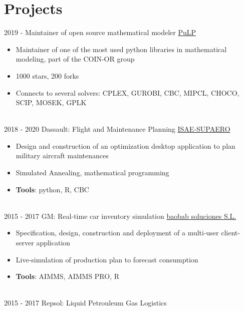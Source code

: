 \documentclass[letterpaper]{twentysecondcv} %
\begin{document}
\section{Projects}
\begin{twenty}
	\twentyitem
    	{2019 - }
		{}
        {Maintainer of open source mathematical modeler}
        {\href{https://github.com/coin-or/pulp}{PuLP}}
        {}
        {
        {\begin{itemize}
        \item Maintainer of one of the most used python libraries in mathematical modeling, part of the COIN-OR group
        \item 1000 stars, 200 forks
        \item Connects to several solvers: CPLEX, GUROBI, CBC, MIPCL, CHOCO, SCIP, MOSEK, GPLK
        \vspace{2mm}
		\end{itemize}}
        }
  \\
  \twentyitem
      {2018 - 2020}
    {}
        {Dassault: Flight and Maintenance Planning}
        {\href{https://www.isae-supaero.fr/en/}{ISAE-SUPAERO}}
        {}
        {
        {\begin{itemize}
        \item Design and construction of an optimization desktop application to plan military aircraft maintenances
        \item Simulated Annealing, mathematical programming
        \item \textbf{Tools}: python, R, CBC
        \vspace{2mm}
    \end{itemize}}
        }
  \\
  \twentyitem
      {2015 - 2017}
    {}
        {GM: Real-time car inventory simulation}
        {\href{https://baobabsoluciones.es/en/}{baobab soluciones S.L.}}
        {}
        {
        {\begin{itemize}
        \item Specification, design, construction and deployment of a multi-user client-server application
        \item Live-simulation of production plan to forecast consumption
        \item \textbf{Tools}: AIMMS, AIMMS PRO, R
        \vspace{2mm}
    \end{itemize}}
        }
  \\
  \twentyitem
      {2015 - 2017 }
    {}
        {Repsol: Liquid Petrouleum Gas Logistics}

\end{twenty}
\end{document}
